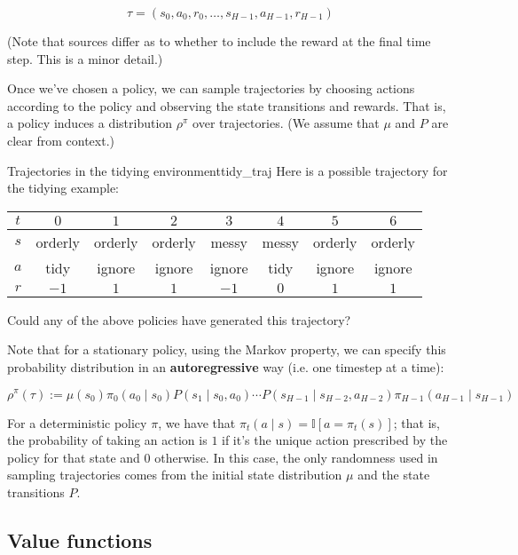 \documentclass[../main/main]{subfiles}
\begin{document}
\[
    \tau = (s_0, a_0, r_0, \dots, s_{H-1}, a_{H-1}, r_{H-1})
\]

(Note that sources differ as to whether to include the reward at the final time step. This is a minor detail.)

Once we've chosen a policy, we can sample trajectories by choosing actions according to the policy and observing the state transitions and rewards. That is, a policy induces a distribution $\rho^{\pi}$ over trajectories. (We assume that $\mu$ and $P$ are clear from context.)

\begin{example}{Trajectories in the tidying environment}{tidy_traj}
    Here is a possible trajectory for the tidying example:

    \begin{center}
    \begin{tabular}{cccccccc}
        $t$ & $0$ & $1$ & $2$ & $3$ & $4$ & $5$ & $6$ \\
        \hline
        $s$ & orderly & orderly & orderly & messy & messy & orderly & orderly \\
        $a$ & tidy & ignore & ignore & ignore & tidy & ignore & ignore \\
        $r$ & $-1$ & $1$ & $1$ & $-1$ & $0$ & $1$ & $1$
    \end{tabular}
    \end{center}

    Could any of the above policies have generated this trajectory?
\end{example}

Note that for a stationary policy, using the Markov property, we can specify this probability distribution in an \textbf{autoregressive} way (i.e. one timestep at a time):

\[
    \rho^{\pi}(\tau) := \mu(s_0) \pi_0(a_0 \mid s_0) P(s_1 \mid s_0, a_0) \cdots P(s_{H-1} \mid s_{H-2}, a_{H-2}) \pi_{H-1}(a_{H-1} \mid s_{H-1})
\]

For a deterministic policy $\pi$, we have that $\pi_t(a \mid s) = \mathbb{I}[a = \pi_t(s)]$; that is, the probability of taking an action is $1$ if it's the unique action prescribed by the policy for that state and $0$ otherwise. In this case, the only randomness used in sampling trajectories comes from the initial state distribution $\mu$ and the state transitions $P$.

\subsection{Value functions}
\end{document}
